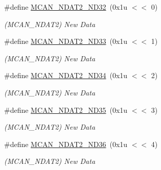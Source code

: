 \begin{DoxyCompactItemize}
\mbox{\label{group__SAMV71__MCAN_gab1fcbd703fff5427c81565013aa9002d}} 
\#define \mbox{\hyperlink{group__SAMV71__MCAN_gab1fcbd703fff5427c81565013aa9002d}{M\+C\+A\+N\+\_\+\+N\+D\+A\+T2\+\_\+\+N\+D32}}~(0x1u $<$$<$ 0)
\begin{DoxyCompactList}\small\item\em (M\+C\+A\+N\+\_\+\+N\+D\+A\+T2) New Data \end{DoxyCompactList}\item 
\mbox{\label{group__SAMV71__MCAN_gacb4c23a64ecb65608a20c1c0b2211b91}} 
\#define \mbox{\hyperlink{group__SAMV71__MCAN_gacb4c23a64ecb65608a20c1c0b2211b91}{M\+C\+A\+N\+\_\+\+N\+D\+A\+T2\+\_\+\+N\+D33}}~(0x1u $<$$<$ 1)
\begin{DoxyCompactList}\small\item\em (M\+C\+A\+N\+\_\+\+N\+D\+A\+T2) New Data \end{DoxyCompactList}\item 
\mbox{\label{group__SAMV71__MCAN_ga838b26ccee48785507256ff3d8d90a95}} 
\#define \mbox{\hyperlink{group__SAMV71__MCAN_ga838b26ccee48785507256ff3d8d90a95}{M\+C\+A\+N\+\_\+\+N\+D\+A\+T2\+\_\+\+N\+D34}}~(0x1u $<$$<$ 2)
\begin{DoxyCompactList}\small\item\em (M\+C\+A\+N\+\_\+\+N\+D\+A\+T2) New Data \end{DoxyCompactList}\item 
\mbox{\label{group__SAMV71__MCAN_ga1c5ac1ccd13a1fd446f439eebf5b8920}} 
\#define \mbox{\hyperlink{group__SAMV71__MCAN_ga1c5ac1ccd13a1fd446f439eebf5b8920}{M\+C\+A\+N\+\_\+\+N\+D\+A\+T2\+\_\+\+N\+D35}}~(0x1u $<$$<$ 3)
\begin{DoxyCompactList}\small\item\em (M\+C\+A\+N\+\_\+\+N\+D\+A\+T2) New Data \end{DoxyCompactList}\item 
\mbox{\label{group__SAMV71__MCAN_gad0ec39dbce8251f9f0231c6fb64774ab}} 
\#define \mbox{\hyperlink{group__SAMV71__MCAN_gad0ec39dbce8251f9f0231c6fb64774ab}{M\+C\+A\+N\+\_\+\+N\+D\+A\+T2\+\_\+\+N\+D36}}~(0x1u $<$$<$ 4)
\begin{DoxyCompactList}\small\item\em (M\+C\+A\+N\+\_\+\+N\+D\+A\+T2) New Data \end{DoxyCompactList}\item 
$$
\end{DoxyCompactItemize}
